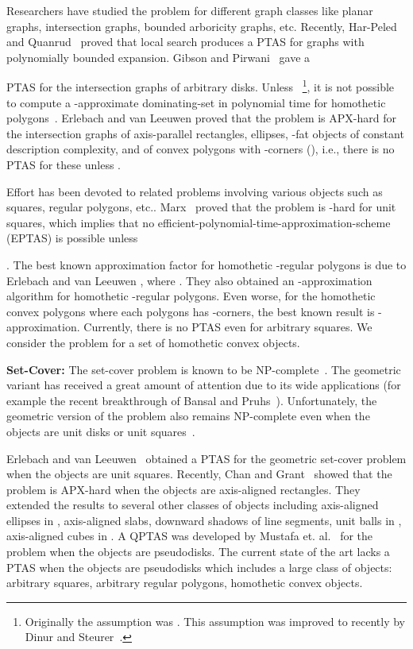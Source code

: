 \documentclass[a4paper,11pt]{article}
\begin{document}
Researchers have studied the problem for different graph 
classes like planar graphs, intersection graphs, bounded arboricity graphs, etc.
Recently, Har-Peled and Quanrud~\cite{Har-PeledQ15} proved that   local search produces
 a PTAS for graphs with polynomially 
bounded expansion. 
Gibson and Pirwani~\cite{GibsonP10} gave a

PTAS for the intersection graphs of arbitrary disks.
Unless ~\cite{DinurS14}\footnote{Originally the assumption was 
. This  assumption was improved to 
 recently by Dinur and Steurer~\cite{DinurS14}.}, it is not possible 
{to compute a} 
-approximate dominating-set  in 
polynomial time  for   homothetic 
polygons~\cite{Feige98, Viggo-Kann-Thesis,Leeuwen-Thesis}.
Erlebach and van Leeuwen \cite{ErlebachL08} proved that  the problem is 
APX-hard for the 
intersection graphs of axis-parallel rectangles, ellipses,  -fat 
objects of constant description complexity, and of convex polygons with 
-corners (),  i.e., there is no PTAS for these  unless 
. 


{Effort has been devoted to related problems involving various objects such as
squares, regular polygons, etc..}
Marx~\cite{Marx06} proved that the problem is -hard for unit 
squares, which implies that no 
efficient-polynomial-time-approximation-scheme (EPTAS) is possible unless 
 
\cite{Marx08}. 
 The best known approximation factor for homothetic -regular 
polygons is  due to Erlebach and van Leeuwen \cite{ErlebachL08}, where 
. They also obtained an -approximation algorithm for homothetic 
-regular polygons.
Even worse, for  the homothetic convex polygons where each 
polygons has -corners, the best known result is -approximation. 
{Currently, there is no}  PTAS  even for arbitrary squares.
We consider the problem for a set of homothetic convex objects.

   
{\bf Set-Cover:}
The set-cover problem is known to be NP-complete~\cite{Karp}.
The geometric variant 
{has received a great amount of attention} due to its wide applications (for example the recent 
breakthrough of Bansal and Pruhs~\cite{BansalP14}). 
Unfortunately, the
geometric version of the problem also remains NP-complete even when the objects 
are unit disks or unit squares~\cite{ChanG, HochbaumM87}. 

Erlebach and van Leeuwen~\cite{ErlebachL10} obtained a PTAS for the geometric  
set-cover problem when the objects are unit squares. Recently, Chan and 
Grant~\cite{ChanG} showed that the  problem is APX-hard when the 
objects are  axis-aligned  rectangles.  They  extended the results to several 
other 
classes of objects including axis-aligned ellipses in , axis-aligned 
slabs, 
downward shadows of line segments,  unit balls in , axis-aligned 
cubes in . A QPTAS {was developed by} Mustafa et. al.~\cite{Ray}  for the problem when the objects are 
pseudodisks. The current {state of the art} lacks a PTAS  when the objects are 
pseudodisks which includes  a large class of objects: arbitrary squares, 
arbitrary regular polygons, homothetic convex objects.
\end{document}
